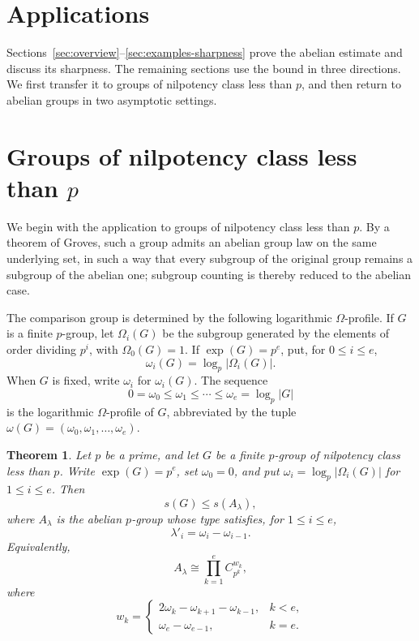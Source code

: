 \documentclass[a4paper,11pt,reqno]{amsart}
\theoremstyle{plain}
\newtheorem{theorem}{Theorem}[section]
\theoremstyle{remark}
\numberwithin{equation}{section}
\newcommand{\card}[1]{\left\lvert #1\right\rvert}
\renewcommand{\leq}{\leqslant}
\begin{document}
\FloatBarrier
\section*{Applications}

Sections~\ref{sec:overview}--\ref{sec:examples-sharpness} prove the abelian estimate and discuss its sharpness. The remaining
sections use the bound in three directions. We first transfer it to groups of
nilpotency class less than $p$, and then return to abelian groups in two
asymptotic settings.

\section{Groups of nilpotency class less than \texorpdfstring{$p$}{p}}
\label{sec:class-less-than-p}

We begin with the application to groups of nilpotency class less than $p$.
By a theorem of Groves, such a group admits an abelian group law on the same
underlying set, in such a way that every subgroup of the original group
remains a subgroup of the abelian one; subgroup counting is thereby reduced
to the abelian case.

The comparison group is determined by the following logarithmic
$\Omega$-profile. If $G$ is a finite
$p$-group, let $\Omega_i(G)$ be the subgroup generated by the elements of
order dividing $p^i$, with $\Omega_0(G)=1$. If $\exp(G)=p^e$, put, for
$0\leq i\leq e$,
\[
        \omega_i(G)=\log_p\card{\Omega_i(G)}.
\]
When $G$ is fixed, write $\omega_i$ for $\omega_i(G)$. The sequence
\[
        0=\omega_0\leq \omega_1\leq\cdots\leq \omega_e=\log_p\card G
\]
is the logarithmic $\Omega$-profile of $G$, abbreviated by the tuple
$\omega(G)=(\omega_0,\omega_1,\ldots,\omega_e)$.

\begin{theorem}\label{thm:groves-reduction}
Let $p$ be a prime, and let $G$ be a finite $p$-group of nilpotency class
less than $p$. Write $\exp(G)=p^e$, set $\omega_0=0$, and put
$\omega_i=\log_p\card{\Omega_i(G)}$ for $1\leq i\leq e$. Then
\[
        s(G)\leq s(A_\lambda),
\]
where $A_\lambda$ is the abelian $p$-group whose type satisfies, for
$1\leq i\leq e$,
\[
        \lambda'_i=\omega_i-\omega_{i-1}.
\]
Equivalently,
\[
        A_\lambda\cong \prod_{k=1}^e C_{p^k}^{w_k},
\]
where
\[
        w_k=
        \begin{cases}
        2\omega_k-\omega_{k+1}-\omega_{k-1}, & k<e,\\
        \omega_e-\omega_{e-1}, & k=e.
        \end{cases}
\]
\end{theorem}
\end{document}
